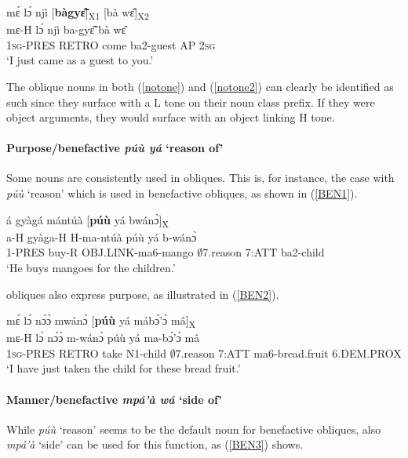 \begin{exe} 
\ex\label{notone2}
  \glll mɛ́ lɔ́ njì [{\bfseries bàgyɛ̃̂}]\textsubscript{X1} [bà wɛ̂]\textsubscript{X2} \\
       mɛ-H lɔ́ njì ba-gyɛ̃̂ bà wɛ̂ \\
       1\textsc{sg}-PRES RETRO come ba2-guest AP 2\textsc{sg}  \\
    \trans `I just came as a guest to you.'
\end{exe}

\noindent The oblique nouns in both (\ref{notone}) and (\ref{notone2}) can clearly be identified as such since they surface with a L tone on their noun class prefix. If they were object arguments, they would surface with an object linking H tone.




\paragraph{Purpose/benefactive {\itshape púù yá} `reason of'}
Some nouns are consistently used in obliques. This is, for instance, the case with {\itshape púù} `reason' which is used in benefactive obliques, as shown in (\ref{BEN1}).

\begin{exe} 
\ex\label{BEN1}
  \glll á gyàgá mántúà [{\bfseries púù} yá bwánɔ̀]\textsubscript{X}\\
        a-H gyàga-H H-ma-ntúà púù yá b-wánɔ̀\\
        1-PRES buy-R OBJ.LINK-ma6-mango $\emptyset$7.reason 7:ATT ba2-child\\
    \trans `He buys mangoes for the children.'
\end{exe}

 obliques also express purpose, as illustrated in (\ref{BEN2}).

\begin{exe} 
\ex\label{BEN2}
  \glll mɛ́ lɔ́ nɔ́ɔ̀ mwánɔ̀ [{\bfseries púù} yá mábɔ́'ɔ̀ mâ]\textsubscript{X} \\
        mɛ-H lɔ́ nɔ́ɔ̀ m-wánɔ̀ púù yá ma-bɔ́'ɔ̀ mâ \\
        1\textsc{sg}-PRES RETRO take N1-child $\emptyset$7.reason 7:ATT ma6-bread.fruit 6.DEM.PROX\\
    \trans `I have just taken the child for these bread fruit.'
\end{exe}

\paragraph{Manner/benefactive {\itshape mpá'à wá} `side of'}
While {\itshape púù} `reason' seems to be the default noun for benefactive obliques, also {\itshape mpá'à} `side' can be used for this function, as (\ref{BEN3}) shows.

